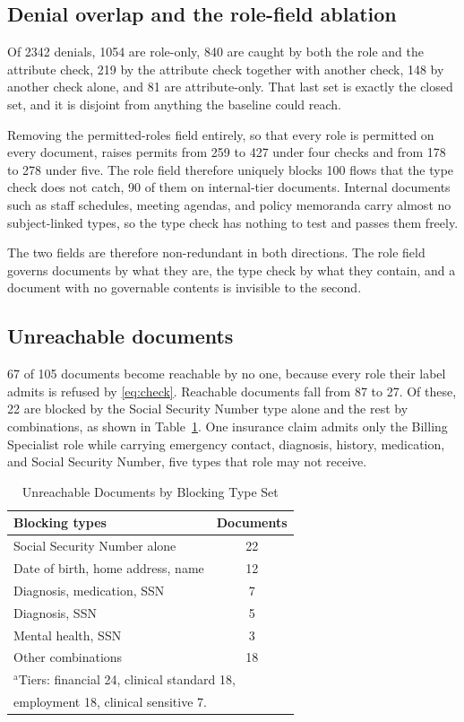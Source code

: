 \documentclass[conference]{IEEEtran}
\begin{document}
\subsection{Denial overlap and the role-field ablation}
\label{sec:overlap}
Of 2342 denials, 1054 are role-only, 840 are caught by both the role and the
attribute check, 219 by the attribute check together with another check, 148 by
another check alone, and 81 are attribute-only. That last set is exactly the
closed set, and it is disjoint from anything the baseline could reach.

Removing the permitted-roles field entirely, so that every role is permitted on
every document, raises permits from 259 to 427 under four checks and from 178 to
278 under five. The role field therefore uniquely blocks 100 flows that the type
check does not catch, 90 of them on internal-tier documents. Internal documents
such as staff schedules, meeting agendas, and policy memoranda carry almost no
subject-linked types, so the type check has nothing to test and passes them
freely.

The two fields are therefore non-redundant in both directions. The role field
governs documents by what they are, the type check by what they contain, and a
document with no governable contents is invisible to the second.

\subsection{Unreachable documents}
\label{sec:unreachable}
67 of 105 documents become reachable by no one, because every role their label
admits is refused by \eqref{eq:check}. Reachable documents fall from 87 to 27.
Of these, 22 are blocked by the Social Security Number type alone and the rest
by combinations, as shown in Table~\ref{tab:unreach}. One insurance claim admits
only the Billing Specialist role while carrying emergency contact, diagnosis,
history, medication, and Social Security Number, five types that role may not
receive.

\begin{table}[htbp]
\caption{Unreachable Documents by Blocking Type Set}
\begin{center}
\begin{tabular}{|l|c|}
\hline
\textbf{Blocking types}&\textbf{Documents} \\
\hline
Social Security Number alone & 22 \\
\hline
Date of birth, home address, name & 12 \\
\hline
Diagnosis, medication, SSN & 7 \\
\hline
Diagnosis, SSN & 5 \\
\hline
Mental health, SSN & 3 \\
\hline
Other combinations & 18 \\
\hline
\multicolumn{2}{l}{$^{\mathrm{a}}$Tiers: financial 24, clinical standard 18,} \\
\multicolumn{2}{l}{employment 18, clinical sensitive 7.} \\
\end{tabular}
\label{tab:unreach}
\end{center}
\end{table}
\end{document}
